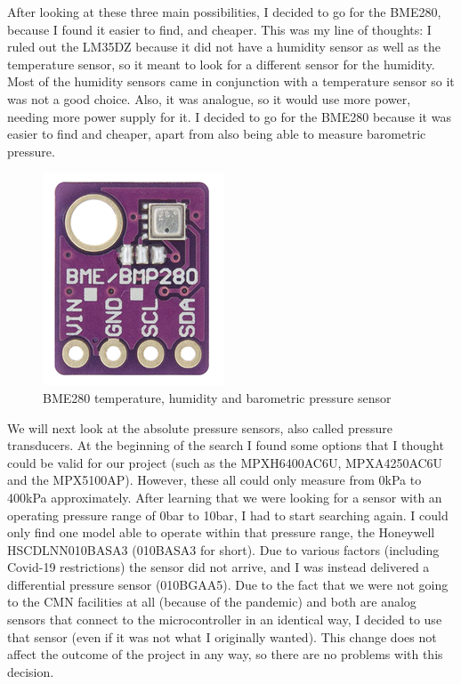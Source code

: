 \documentclass[12pt]{article}
\begin{document}
After looking at these three main possibilities, I decided to go for the BME280, because I found it easier to find, and cheaper. This was my line of thoughts: I ruled out the LM35DZ because it did not have a humidity sensor as well as the temperature sensor, so it meant to look for a different sensor for the humidity. Most of the humidity sensors came in conjunction with a temperature sensor so it was not a good choice. Also, it was analogue, so it would use more power, needing more power supply for it. I decided to go for the BME280 because it was easier to find and cheaper, apart from also being able to measure barometric pressure.\par

\begin{figure}[h]
\label{fig:bme280}
\includegraphics[scale=0.25]{BMX280}
\centering
\caption{BME280 temperature, humidity and barometric pressure sensor}
\end{figure}

We will next look at the absolute pressure sensors, also called pressure transducers. At the beginning of the search I found some options that I thought could be valid for our project (such as the MPXH6400AC6U, MPXA4250AC6U and the MPX5100AP). However, these all could only measure from 0kPa to 400kPa approximately. After learning that we were looking for a sensor with an operating pressure range of 0bar to 10bar, I had to start searching again. I could only find one model able to operate within that pressure range, the Honeywell HSCDLNN010BASA3 (010BASA3 for short). Due to various factors (including Covid-19 restrictions) the sensor did not arrive, and I was instead delivered a differential pressure sensor (010BGAA5). Due to the fact that we were not going to the CMN facilities at all (because of the pandemic) and both are analog sensors that connect to the microcontroller in an identical way, I decided to use that sensor (even if it was not what I originally wanted). This change does not affect the outcome of the project in any way, so there are no problems with this decision.
\end{document}
